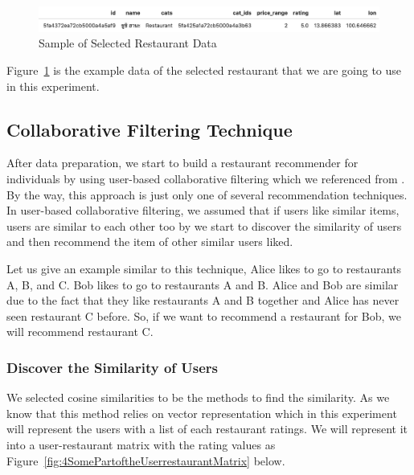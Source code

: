 \documentclass[12pt,oneside,openright,a4paper]{cpe-english-project}
\begin{document}
\begin{figure}[H]\centering
\includegraphics[width=350pt]{./images/4SampleofSelectedRestaurantData.png}
\caption{Sample of Selected Restaurant Data}\label{fig:4SampleofSelectedRestaurantData}
\end{figure}\vspace{-24pt}

Figure~\ref{fig:4SampleofSelectedRestaurantData} is the example data of the selected restaurant that we are going to use in this experiment.

\subsection{Collaborative Filtering Technique} \label{sec:cf}

After data preparation, we start to build a restaurant recommender for individuals by using user-based collaborative filtering which we referenced from  \cite{BuildauserbasedcollaborativefilteringrecommendationengineforAnime}. By the way, this approach is just only one of several recommendation techniques. In user-based collaborative filtering, we assumed that if users like similar items, users are similar to each other too by we start to discover the similarity of users and then recommend the item of other similar users liked.

Let us give an example similar to this technique, Alice likes to go to restaurants A, B, and C. Bob likes to go to restaurants A and B. Alice and Bob are similar due to the fact that they like restaurants A and B together and Alice has never seen restaurant C before. So, if we want to recommend a restaurant for Bob, we will recommend restaurant C.

\subsubsection{Discover the Similarity of Users}

We selected cosine similarities to be the methods to find the similarity. As we know that this method relies on vector representation which in this experiment will represent the users with a list of each restaurant ratings. We will represent it into a user-restaurant matrix with the rating values as Figure~\ref{fig:4SomePartoftheUserrestaurantMatrix} below.
\end{document}

